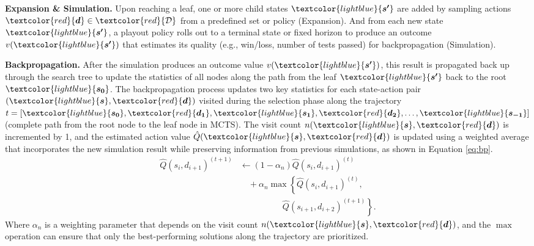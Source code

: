 \documentclass[11pt]{article}
\theoremstyle{definition}
\theoremstyle{remark}
\begin{document}
\textbf{Expansion \& Simulation.} Upon reaching a leaf, one or more child states $\textcolor{lightblue}{\boldsymbol{s'}}$ are added by sampling actions $\textcolor{red}{\boldsymbol{d}}\in\textcolor{red}{\mathcal{D}}$ from a predefined set or policy (Expansion). And from each new state $\textcolor{lightblue}{\boldsymbol{s'}}$, a playout policy rolls out to a terminal state or fixed horizon to produce an outcome $v(\textcolor{lightblue}{\boldsymbol{s'}})$ that estimates its quality (e.g., win/loss, number of tests passed) for backpropagation (Simulation).



\textbf{Backpropagation.} After the simulation produces an outcome value $v(\textcolor{lightblue}{\boldsymbol{s'}})$, this result is propagated back up through the search tree to update the statistics of all nodes along the path from the leaf $\textcolor{lightblue}{\boldsymbol{s'}}$ back to the root $\textcolor{lightblue}{\boldsymbol{s_0}}$. The backpropagation process updates two key statistics for each state-action pair $(\textcolor{lightblue}{\boldsymbol{s}}, \textcolor{red}{\boldsymbol{d}})$ visited during the selection phase along the trajectory $t = [\textcolor{lightblue}{\boldsymbol{s_0}}, \textcolor{red}{\boldsymbol{d_1}}, \textcolor{lightblue}{\boldsymbol{s_1}}, \textcolor{red}{\boldsymbol{d_2}}, \ldots, \textcolor{lightblue}{\boldsymbol{s_{-1}}}]$ (complete path from the root node to the leaf node in MCTS). The visit count $n(\textcolor{lightblue}{\boldsymbol{s}}, \textcolor{red}{\boldsymbol{d}})$ is incremented by 1, and the estimated action value $\hat{Q}(\textcolor{lightblue}{\boldsymbol{s}}, \textcolor{red}{\boldsymbol{d}})$ is updated using a weighted average that incorporates the new simulation result while preserving information from previous simulations, as shown in Equation \ref{eq:bp}.
\begin{equation}
\label{eq:bp}
\begin{aligned}
\hat{Q}(s_i,d_{i+1})^{(t+1)}
&\leftarrow (1-\alpha_n)\hat{Q}(s_i,d_{i+1})^{(t)} \\
&\quad + \alpha_n \max\left\{
\hat{Q}(s_i,d_{i+1})^{(t)},\right.\\
&\qquad\qquad\quad \left.
\hat{Q}(s_{i+1},d_{i+2})^{(t+1)}
\right\}.
\end{aligned}
\end{equation}
Where $\alpha_n$ is a weighting parameter that depends on the visit count $n(\textcolor{lightblue}{\boldsymbol{s}}, \textcolor{red}{\boldsymbol{d}})$, and the $\max$ operation can ensure that only the best-performing solutions along the trajectory are prioritized. 
\end{document}
